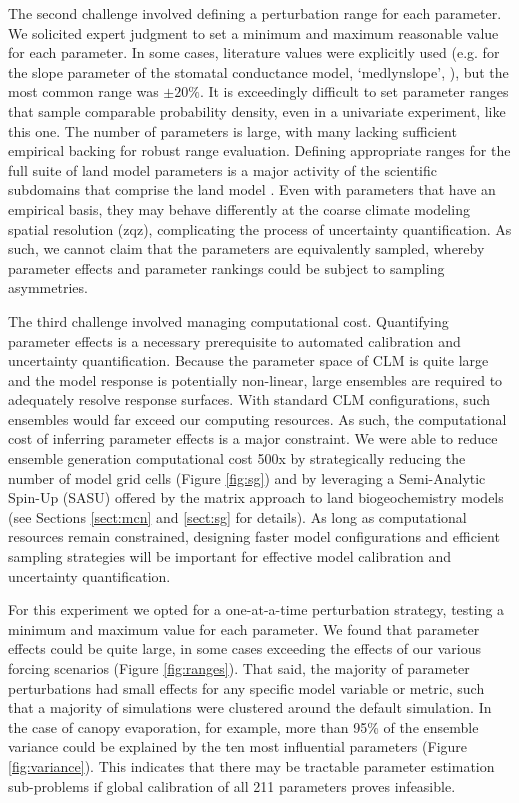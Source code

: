 \documentclass[draft]{agujournal2019}
\begin{document}
The second challenge involved defining a perturbation range for each parameter. We solicited expert judgment to set a minimum and maximum reasonable value for each parameter. In some cases, literature values were explicitly used (e.g. for the slope parameter of the stomatal conductance model, `medlynslope', ), but the most common range was $\pm20\%$. It is exceedingly difficult to set parameter ranges that sample comparable probability density, even in a univariate experiment, like this one. The number of parameters is large, with many lacking sufficient empirical backing for robust range evaluation. Defining appropriate ranges for the full suite of land model parameters is a major activity of the scientific subdomains that comprise the land model \cite{kattge2020}. Even with parameters that have an empirical basis, they may behave differently at the coarse climate modeling spatial resolution (zqz), complicating the process of uncertainty quantification. As such, we cannot claim that the parameters are equivalently sampled, whereby parameter effects and parameter rankings could be subject to sampling asymmetries.

The third challenge involved managing computational cost.  Quantifying parameter effects is a necessary prerequisite to automated calibration and uncertainty quantification. Because the parameter space of CLM is quite large and the model response is potentially non-linear, large ensembles are required to adequately resolve response surfaces. With standard CLM configurations, such ensembles would far exceed our computing resources. As such, the computational cost of inferring parameter effects is a major constraint. We were able to reduce ensemble generation computational cost 500x by strategically reducing the number of model grid cells (Figure \ref{fig:sg}) and by leveraging a Semi-Analytic Spin-Up (SASU) offered by the matrix approach to land biogeochemistry models \cite{lu2020,luo2022,liao2023} (see Sections \ref{sect:mcn} and \ref{sect:sg} for details). As long as computational resources remain constrained, designing faster model configurations and efficient sampling strategies will be important for effective model calibration and uncertainty quantification. 

For this experiment we opted for a one-at-a-time perturbation strategy, testing a minimum and maximum value for each parameter. We found that parameter effects could be quite large, in some cases exceeding the effects of our various forcing scenarios (Figure \ref{fig:ranges}). That said, the majority of parameter perturbations had small effects for any specific model variable or metric, such that a majority of simulations were clustered around the default simulation. In the case of canopy evaporation, for example, more than 95\% of the ensemble variance could be explained by the ten most influential parameters (Figure \ref{fig:variance}). This indicates that there may be tractable parameter estimation sub-problems if global calibration of all 211 parameters proves infeasible. 
\end{document}
